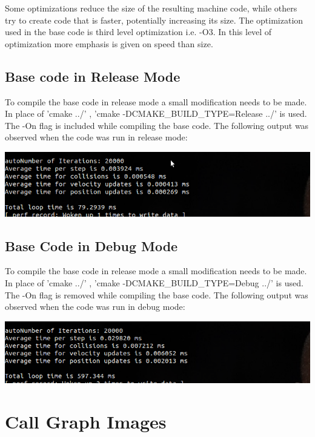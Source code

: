 \documentclass [11pt]{report}
\begin{document}
Some optimizations reduce the size of the resulting machine code, while others try to create code that is faster, potentially increasing its size.
The optimization used in the base code is third level optimization i.e. -O3. In this level of optimization more emphasis is given on speed than size.
\newpage
\subsection{Base code in Release Mode}
To compile the base code in release mode a small modification needs to be made. In place of 'cmake ../' , 'cmake -DCMAKE\_BUILD\_TYPE=Release ../' is used. The -On flag is included while compiling the base code.
The following output was observed when the code was run in release mode:\\
\begin{center}
\includegraphics[scale=0.6]{./images/release.png}
\end{center}

\subsection{Base Code in Debug Mode}
To compile the base code in release mode a small modification needs to be made. In place of 'cmake ../' , 'cmake -DCMAKE\_BUILD\_TYPE=Debug ../' is used. The -On flag is removed while compiling the base code.
The following output was observed when the code was run in debug mode:\\
\begin{center}
\includegraphics[scale=0.6]{./images/debug.png}
\end{center}



\section{Call Graph Images}
\end{document}
